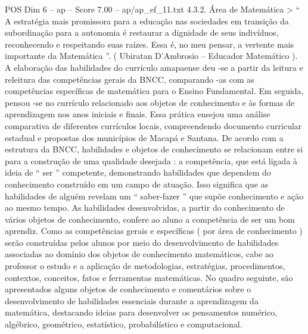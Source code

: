 \begin{textsample}{POS Dim 6 – ap – Score 7.00 – ap/ap\_ef\_11.txt}  \label{ex:f6_pos_110}
4.3.2.
Área de Matemática > “ A estratégia mais promissora para a educação nas sociedades em transição da subordinação para a autonomia é restaurar a dignidade de seus indivíduos, reconhecendo e respeitando suas raízes.
Essa é, no meu pensar, a vertente mais importante da Matemática ”. ( Ubiratan D’Ambrosio – Educador Matemático ).
A elaboração das habilidades do currículo amapaense deu -se a partir da leitura e releitura das competências gerais da BNCC, comparando -as com as competências específicas de matemática para o Ensino Fundamental.
Em seguida, pensou -se no currículo relacionado aos objetos de conhecimento e às formas de aprendizagem nos anos iniciais e finais.
Essa prática ensejou uma análise comparativa de diferentes currículos locais, compreendendo documento curricular estadual e propostas dos municípios de Macapá e Santana.
De acordo com a estrutura da BNCC, habilidades e objetos de conhecimento se relacionam entre si para a construção de uma qualidade desejada : a competência, que está ligada à ideia de “ ser ” competente, demonstrando habilidades que dependem do conhecimento construído em um campo de atuação.
Isso significa que as habilidades de alguém revelam um “ saber-fazer ” que supõe conhecimento e ação ao mesmo tempo.
As habilidades desenvolvidas, a partir do conhecimento de vários objetos de conhecimento, confere ao aluno a competência de ser um bom aprendiz.
Como as competências gerais e específicas ( por área de conhecimento ) serão construídas pelos alunos por meio do desenvolvimento de habilidades associadas ao domínio dos objetos de conhecimento matemáticos, cabe ao professor o estudo e a aplicação de metodologias, estratégias, procedimentos, contextos, conceitos, fatos e ferramentas matemáticas.
No quadro seguinte, são apresentados alguns objetos de conhecimento e comentários sobre o desenvolvimento de habilidades essenciais durante a aprendizagem da matemática, destacando ideias para desenvolver os pensamentos numérico, algébrico, geométrico, estatístico, probabilístico e computacional.

\end{textsample}
